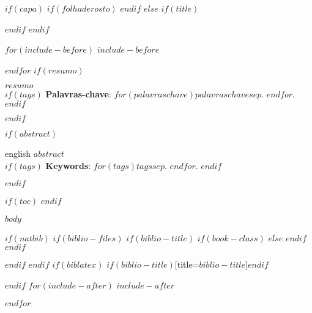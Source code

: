 \documentclass[$if(fontsize)$$fontsize$,$endif$$if(papersize)$$papersize$,$endif$$for(classoption)$$classoption$$sep$,$endfor$,$if(lang)$$lang$,$endif$]{$documentclass$}	%
\begin{document}
$if(capa)$
\imprimircapa	%
$if(folhaderosto)$
\imprimirfolhaderosto	%
$endif$
$else$
$if(title)$
\maketitle	%
$endif$
$endif$

$for(include-before)$
$include-before$

$endfor$
$if(resumo)$
\begin{resumo}
$resumo$   %
\\
$if(tags)$
\vspace{\onelineskip}
\noindent\textbf{Palavras-chave}: $for(palavraschave)$$palavraschave$$sep$. $endfor$.  %
$endif$
\end{resumo}
$endif$

$if(abstract)$
\begin{resumo}[Abstract]
\begin{otherlanguage*}{english}
$abstract$   %
\\
$if(tags)$
\vspace{\onelineskip}
\noindent\textbf{Keywords}: $for(tags)$$tags$$sep$. $endfor$.  %
$endif$
\end{otherlanguage*}
\end{resumo}
$endif$

$if(toc)$
{
\hypersetup{linkcolor=black}
\setcounter{tocdepth}{$toc-depth$}
\noindent\tableofcontents* %
\cleardoublepage
}
$endif$

\textual	%
$body$	%

$if(natbib)$
$if(biblio-files)$
$if(biblio-title)$
$if(book-class)$
\renewcommand\bibname{$biblio-title$}
$else$
\renewcommand\refname{$biblio-title$}
$endif$
$endif$


$endif$
$endif$
$if(biblatex)$
\printbibliography$if(biblio-title)$[title=$biblio-title$]$endif$

$endif$
$for(include-after)$
$include-after$

$endfor$
\end{document}
